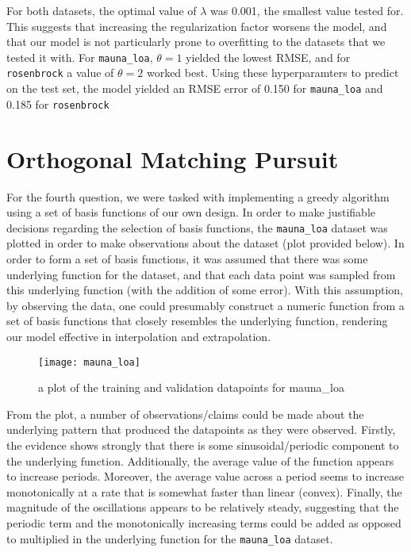 \documentclass{article}
\begin{document}
For both datasets, the optimal value of $\lambda$ was 0.001, the smallest value tested for. This suggests that increasing the regularization factor worsens the model, and that our model is not particularly prone to overfitting to the datasets that we tested it with. For \verb+mauna_loa+, $\theta = 1$ yielded the lowest RMSE, and for \verb+rosenbrock+ a value of $\theta = 2$ worked best. Using these hyperparamters to predict on the test set, the model yielded an RMSE error of 0.150 for \verb+mauna_loa+ and 0.185 for \verb+rosenbrock+


\pagebreak
\fi
\section{Orthogonal Matching Pursuit}
For the fourth question, we were tasked with implementing a greedy algorithm using a set of basis functions of our own design. In order to make justifiable decisions regarding the selection of basis functions, the \verb+mauna_loa+ dataset was plotted in order to make observations about the dataset (plot provided below). In order to form a set of basis functions, it was assumed that there was some underlying function for the dataset, and that each data point was sampled from this underlying function (with the addition of some error). With this assumption, by observing the data, one could presumably construct a numeric function from a set of basis functions that closely resembles the underlying function, rendering our model effective in interpolation and extrapolation.

\begin{figure}[H]
\centering
\texttt{[image: mauna\_loa]}
\caption{a plot of the training and validation datapoints for mauna\_loa}
\end{figure}

From the plot, a number of observations/claims could be made about the underlying pattern that produced the datapoints as they were observed. Firstly, the evidence shows strongly that there is some sinusoidal/periodic component to the underlying function. Additionally, the average value of the function appears to increase periods. Moreover, the average value across a period seems to increase monotonically at a rate that is somewhat faster than linear (convex). Finally, the magnitude of the oscillations appears to be relatively steady, suggesting that the periodic term and the monotonically increasing terms could be added as opposed to multiplied in the underlying function for the \verb+mauna_loa+ dataset.
\end{document}
